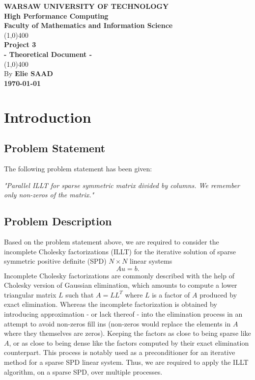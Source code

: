 \documentclass[11pt]{article}
\theoremstyle{definition}
\begin{document}
\begin{titlepage}
\begin{center}
\vspace*{1cm}
\Large{\textbf{\MakeUppercase{Warsaw University of Technology}}}\\[3mm]
\huge{\textbf{High Performance Computing}}\\[3mm]
\Large{\textbf{Faculty of Mathematics and Information Science}}\\
\vfill
\line(1,0){400}\\[1mm]
\huge{\textbf{Project 3}}\\[3mm]
\Large{\textbf{- Theoretical Document -}}\\[1mm]
\line(1,0){400}\\
\vfill
By \textbf{Elie SAAD}\\
\Large{\textbf{\today}}\\
\end{center}
\end{titlepage}

\tableofcontents
\thispagestyle{empty}
\clearpage

\section{Introduction}

\subsection{Problem Statement}

The following problem statement has been given:
\begin{center}
\textit{"Parallel ILLT for sparse symmetric matrix divided by columns. We remember only non-zeros of the matrix."}
\end{center}

\subsection{Problem Description}

Based on the problem statement above, we are required to consider the incomplete Cholesky factorizations (ILLT) for the iterative solution of sparse symmetric positive definite (SPD) $N\times N$ linear systems
\begin{equation*}
Au=b.
\end{equation*}
Incomplete Cholesky factorizations are commonly described with the help of Cholesky version of Gaussian elimination, which amounts to compute a lower triangular matrix $L$ such that $A=LL^T$ where $L$ is a factor of $A$ produced by exact elimination. Whereas the incomplete factorization is obtained by introducing approximation - or lack thereof - into the elimination process in an attempt to avoid non-zeros fill ins (non-zeros would replace the elements in $A$ where they themselves are zeros). Keeping the factors as close to being sparse like $A$, or as close to being dense like the factors computed by their exact elimination counterpart. This process is notably used as a preconditioner for an iterative method for a sparse SPD linear system. Thus, we are required to apply the ILLT algorithm, on a sparse SPD, over multiple processes.
\end{document}
